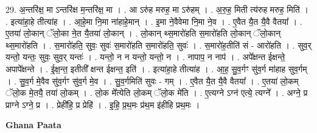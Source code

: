 \documentclass[17pt]{extarticle}
\begin{document}
29. अ॒न्तरि॑क्ष॒ मा ऽन्तरि॑क्ष म॒न्तरि॑क्ष॒ मा । . आ ऽरु॑ह मरुह॒ मा ऽरु॑हम् । . अ॒रु॒ह॒ मिती त्य॑रुह मरुह॒ मिति॑ । . इत्या॑हा॒हे तीत्या॑ह । . आ॒हे॒मा नि॒मा ना॑हाहे॒मान् । . इ॒मा ने॒वैवेमा नि॒मा ने॒व । . ए॒वैत यै॒त यै॒वै वैतया᳚ । . ए॒तया॑ लो॒कान् ॅलो॒का ने॒त यै॒तया॑ लो॒कान् । . लो॒कान् थ्स॒मारो॑हति स॒मारो॑हति लो॒कान् ॅलो॒कान् थ्स॒मारो॑हति । . स॒मारो॑हति॒ सुवः॒ सुवः॑ स॒मारो॑हति स॒मारो॑हति॒ सुवः॑ । . स॒मारो॑ह॒तीति॑ सं - आरो॑हति । . सुव॒र् यन्तो॒ यन्तः॒ सुवः॒ सुव॒र् यन्तः॑ । . यन्तो॒ न न यन्तो॒ यन्तो॒ न । . नापाप॒ न नाप॑ । . अपे᳚क्षन्त ईक्षन्ते॒ अपापे᳚क्षन्ते । . ई॒क्ष॒न्त॒ इतीती᳚ क्षन्त ईक्षन्त॒ इति॑ । . इत्या॑हा॒हे तीत्या॑ह । . आ॒ह॒ सु॒व॒र्गꣳ सु॑व॒र्ग मा॑हाह सुव॒र्गम् । . सु॒व॒र्ग मे॒वैव सु॑व॒र्गꣳ सु॑व॒र्ग मे॒व । . सु॒व॒र्गमिति॑ सुवः - गम् । . ए॒वैत यै॒त यै॒वै वैतया᳚ । . ए॒तया॑ लो॒कम् ॅलो॒क मे॒तयै॒ तया॑ लो॒कम् । . लो॒क मे᳚त्येति लो॒कम् ॅलो॒क मे॑ति । . ए॒त्यग्ने ऽग्न॑ एत्ये॒ त्यग्ने᳚ । . अग्ने॒ प्र प्राग्ने ऽग्ने॒ प्र । . प्रेही॑हि॒ प्र प्रेहि॑ । . इ॒हि॒ प्र॒थ॒मः प्र॑थ॒म इ॑हीहि प्रथ॒मः । \newline

\textbf{Ghana Paata } \newline
\end{document}
